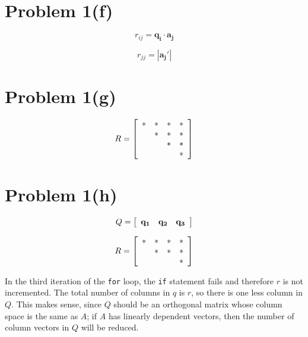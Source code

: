 \documentclass{article}
\newif\ifstays
\begin{document}
\section*{Problem 1(f)}


$$ r_{ij} = \mathbf{q_i} \cdot \mathbf{a_j} $$

$$ r_{jj} = |\mathbf{a_j'}|$$

\section*{Problem 1(g)}

\[
R = \left[\begin{array}{*{4}c}
 \ast & \ast  & \ast & \ast\\
 & \ast & \ast & \ast\\
 &  & \ast &\ast \\
 &  &  & \ast
\end{array}\right]
\]

\ifstays
Here is how you would write the fill pattern for a $4\times 4$ identity matrix:
\[
I = \left[\begin{array}{*{4}c}
 \ast &  &  & \\
 & \ast &  & \\
 &  & \ast & \\
 &  &  & \ast
\end{array}\right]
\]
\fi

\section*{Problem 1(h)}

\[
Q = \left[\begin{array}{*{4}c}
 \mathbf{q_1} & \mathbf{q_2}  & \mathbf{q_3}\\
\end{array}\right]
\]

\[
R = \left[\begin{array}{*{4}c}
 \ast & \ast  & \ast & \ast\\
 & \ast & \ast & \ast\\
 &  &  &\ast  \\
\end{array}\right]
\]

In the third iteration of the \verb#for# loop, the \verb#if# statement fails and therefore $r$ is not incremented. The total number of columns in $q$ is $r$, so there is one less column in $Q$. This makes sense, since $Q$ should be an orthogonal matrix whose column space is the same as $A$; if $A$ has linearly dependent vectors, then the number of column vectors in $Q$ will be reduced.
\end{document}
